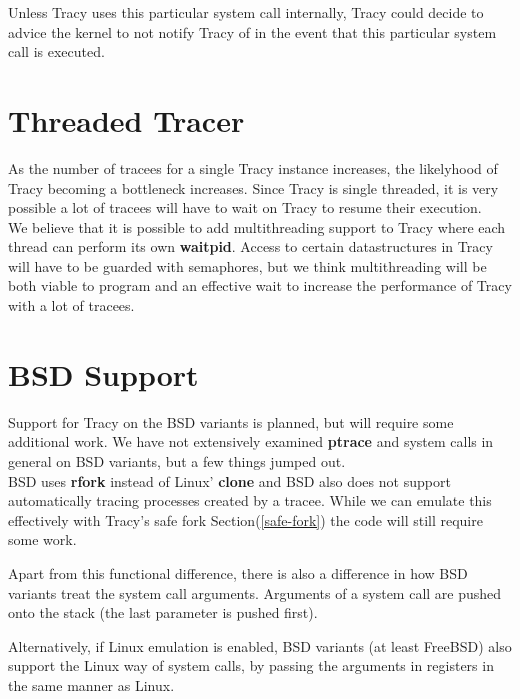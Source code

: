 \documentclass[a4paper, 10pt]{report}
\begin{document}
Unless Tracy uses this particular system call internally, Tracy could decide
to advice the kernel to not notify Tracy of in the event that this particular
system call is executed.


\section{Threaded Tracer}

As the number of tracees for a single Tracy instance increases, the
likelyhood of Tracy becoming a bottleneck increases. Since Tracy is
single threaded, it is very possible a lot of tracees will have to wait
on Tracy to resume their execution. \\

We believe that it is possible to add multithreading support to Tracy where
each thread can perform its own \textbf{waitpid}. Access to certain
datastructures in Tracy will have to be guarded with semaphores, but
we think multithreading will be both viable to program and an effective
wait to increase the performance of Tracy with a lot of tracees.


\section{BSD Support}

Support for Tracy on the BSD variants is planned, but will require some
additional work. We have not extensively examined \textbf{ptrace} and
system calls in general on BSD variants, but a few things jumped out. \\

BSD uses \textbf{rfork} instead of Linux' \textbf{clone} and BSD also does
not support automatically tracing processes created by a tracee. While
we can emulate this effectively with Tracy's safe fork
Section(\ref{safe-fork}) the code will still require some work.

Apart from this functional difference, there is also a difference in
how BSD variants treat the system call arguments. Arguments of a system
call are pushed onto the stack (the last parameter is pushed first).
\cite{int80h}

Alternatively, if Linux emulation is enabled, BSD variants (at least FreeBSD)
also support the Linux way of system calls, by passing the arguments in
registers in the same manner as Linux.
\end{document}
